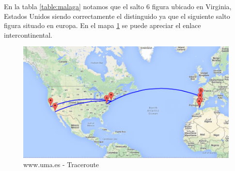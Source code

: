 En la tabla \ref{table:malaga} notamos que el salto 6 figura ubicado en Virginia, Estados Unidos siendo correctamente el distinguido ya que el siguiente salto figura situado en europa. En el mapa \ref{mapa:malaga} se puede apreciar el enlace intercontinental.


\begin{figure}[H]
    \begin{center}
        \includegraphics[width=1\textwidth]{data/mapa-malaga.png}
        \caption{www.uma.es - Traceroute}
        \label{mapa:malaga}
    \end{center}
\end{figure}

